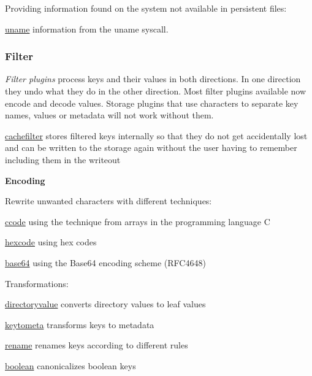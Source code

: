 Providing information found on the system not available in persistent files\+:


\begin{DoxyItemize}
\item \hyperlink{md_src_plugins_uname_README_src_plugins_uname_README_md}{uname} information from the uname syscall.
\end{DoxyItemize}

\subsubsection*{Filter}

{\itshape Filter plugins} process keys and their values in both directions. In one direction they undo what they do in the other direction. Most filter plugins available now encode and decode values. Storage plugins that use characters to separate key names, values or metadata will not work without them.


\begin{DoxyItemize}
\item \hyperlink{md_src_plugins_cachefilter_README_src_plugins_cachefilter_README_md}{cachefilter} stores filtered keys internally so that they do not get accidentally lost and can be written to the storage again without the user having to remember including them in the writeout
\end{DoxyItemize}

{\bfseries Encoding}

Rewrite unwanted characters with different techniques\+:


\begin{DoxyItemize}
\item \hyperlink{md_src_plugins_ccode_README_src_plugins_ccode_README_md}{ccode} using the technique from arrays in the programming language C
\item \hyperlink{md_src_plugins_hexcode_README_src_plugins_hexcode_README_md}{hexcode} using hex codes
\item \hyperlink{md_src_plugins_base64_README_src_plugins_base64_README_md}{base64} using the Base64 encoding scheme (R\+F\+C4648)
\end{DoxyItemize}

Transformations\+:


\begin{DoxyItemize}
\item \hyperlink{md_src_plugins_directoryvalue_README_src_plugins_directoryvalue_README_md}{directoryvalue} converts directory values to leaf values
\item \hyperlink{md_src_plugins_keytometa_README_src_plugins_keytometa_README_md}{keytometa} transforms keys to metadata
\item \hyperlink{md_src_plugins_rename_README_src_plugins_rename_README_md}{rename} renames keys according to different rules
\item \hyperlink{md_src_plugins_boolean_README_src_plugins_boolean_README_md}{boolean} canonicalizes boolean keys
\end{DoxyItemize}

